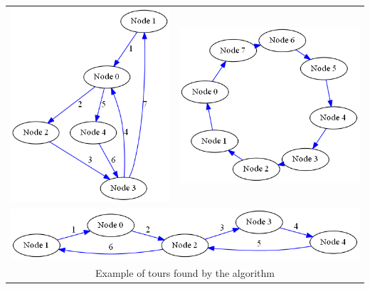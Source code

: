 \documentclass{article}
\begin{document}
\begin{tabular}{cc} 
	\includegraphics[scale=0.5]{img/random_graph_cycle.png} & \includegraphics[scale=0.5]{img/ring_graph_cycle.png} \\
	\multicolumn{2}{c}{\includegraphics[scale=0.5]{img/triangle_graph_cycle.png}} \\
	\multicolumn{2}{c}{Example of tours found by the algorithm}
\end{tabular}
\end{document}
